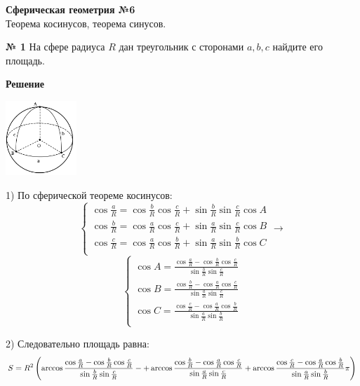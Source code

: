 


    \begin{center}
        \textbf{Сферическая геометрия №6}\\
        Теорема косинусов, теорема синусов.
    \end{center}

    \textbf{№ 1}
    На сфере радиуса $R$ дан треугольник с сторонами $a, b, c$ найдите его площадь.

    \textbf{Решение}\\

    \begin{center}
        \includegraphics[width=0.2\textwidth]{images/img3}\\
    \end{center}

    1) По сферической теореме косинусов:
    \[
        \begin{cases}
            \cos \frac{a}{R} = \cos \frac{b}{R}\cos\frac{c}{R} + \sin \frac{b}{R}\sin\frac{c}{R}\cos A\\
            \cos \frac{b}{R} = \cos \frac{a}{R}\cos\frac{c}{R} + \sin \frac{a}{R}\sin\frac{c}{R}\cos B\\
            \cos \frac{c}{R} = \cos \frac{a}{R}\cos\frac{b}{R} + \sin \frac{a}{R}\sin\frac{b}{R}\cos C\\
        \end{cases}
        \rightarrow
    \]
    \[
        \begin{cases}
            \cos A = \frac{\cos \frac{a}{R} - \cos \frac{b}{R}\cos\frac{c}{R}}{\sin \frac{b}{R}\sin\frac{c}{R}}\\
            \cos B = \frac{\cos \frac{b}{R} - \cos \frac{a}{R}\cos\frac{c}{R}}{\sin \frac{a}{R}\sin\frac{c}{R}}\\
            \cos C = \frac{\cos \frac{c}{R} - \cos \frac{a}{R}\cos\frac{b}{R}}{\sin \frac{a}{R}\sin\frac{b}{R}}\\
        \end{cases}
    \]

    2) Следовательно площадь равна:
    \[
        S = R^2\left(\arccos \frac{\cos \frac{a}{R} - \cos \frac{b}{R}\cos\frac{c}{R}}{\sin \frac{b}{R}\sin\frac{c}{R}} -
        + \arccos  \frac{\cos \frac{b}{R} - \cos \frac{a}{R}\cos\frac{c}{R}}{\sin \frac{a}{R}\sin\frac{c}{R}}
        + \arccos \frac{\cos \frac{c}{R} - \cos \frac{a}{R}\cos\frac{b}{R}}{\sin \frac{a}{R}\sin\frac{b}{R}}\\
        \pi\right)
    \]\\


